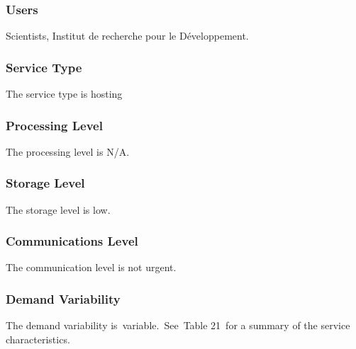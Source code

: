 \documentclass[a4paper]{article}
\begin{document}
\subsubsection[Users]{ Users}
\hypertarget{Toc381777298}{}{
Scientists, Institut de recherche pour le D\'eveloppement.}

\subsubsection[Service Type]{ Service Type}
\hypertarget{Toc381777299}{}{
The service type is hosting}

\subsubsection[Processing Level]{ Processing
Level}
\hypertarget{Toc381777300}{}{
The processing level is N/A.}

\subsubsection[Storage Level]{ Storage Level}
\hypertarget{Toc381777301}{}{
The storage level is low.}

\subsubsection[Communications Level]{
Communications Level}
\hypertarget{Toc381777302}{}{
The communication level is not urgent.\ }

\subsubsection[Demand Variability]{ Demand
Variability}
\hypertarget{Toc381777303}{}The demand variability
is\ variable.\ \foreignlanguage{english}{See\ }Table
21\foreignlanguage{english}{\ for a summary of the service
characteristics.}


\bigskip


\bigskip

\end{document}

